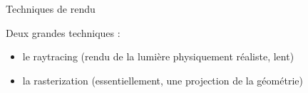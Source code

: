 \documentclass[compress]{beamer}
\begin{document}


\begin{frame}{Techniques de rendu}

    Deux grandes techniques :
    \begin{itemize}
        \item le {\Medium raytracing} (rendu de la lumière physiquement réaliste, lent)
        \item la {\Medium rasterization} (essentiellement, une projection de la géométrie)
    \end{itemize}
\end{frame}

\end{document}
